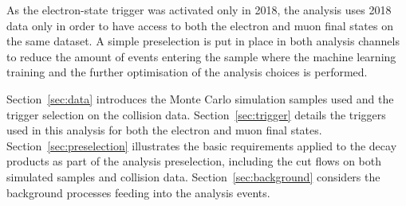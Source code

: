 As the electron-state trigger was activated only in 2018,
the analysis uses 2018 data only in order to have access
to both the electron and muon final states on the same
dataset.
A simple preselection is put in place in both analysis
channels to reduce the amount of events entering the
sample where the machine learning training and the
further optimisation of the analysis choices is performed.

Section~\ref{sec:data} introduces the Monte Carlo simulation
samples used and the trigger selection on the collision data.
Section~\ref{sec:trigger} details the triggers used in this
analysis for both the electron and muon final states.
Section~\ref{sec:preselection} illustrates the basic requirements
applied to the decay products as part of the analysis preselection,
including the cut flows on both simulated samples and collision data.
Section~\ref{sec:background} considers the background processes
feeding into the analysis events.







